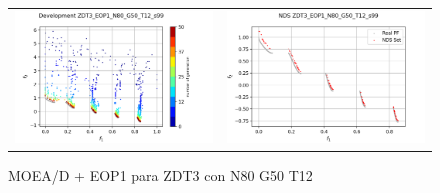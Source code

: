 \begin{figure}[H]
\begin{tabular}{c c}
    \includegraphics[scale=0.5]{figures/ZDT3_EOP1_N80_G50_T12/s99_dev.png} &
    \includegraphics[scale=0.5]{figures/ZDT3_EOP1_N80_G50_T12/s99_nds.png}\\
    \end{tabular}
    \caption{MOEA/D + EOP1 para ZDT3 con N80 G50 T12 }
    \label{fig:14}
\end{figure}

